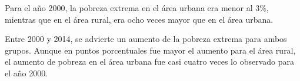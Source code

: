 Para el año 2000, la pobreza extrema en el área urbana era menor al 3\%, mientras que en el área rural, era ocho veces mayor que en el área urbana. 

Entre 2000 y 2014, se advierte un aumento de la pobreza extrema para ambos grupos. Aunque en puntos porcentuales fue mayor el aumento para el área rural, el aumento de pobreza en el área urbana fue casi cuatro veces lo observado para el año 2000.